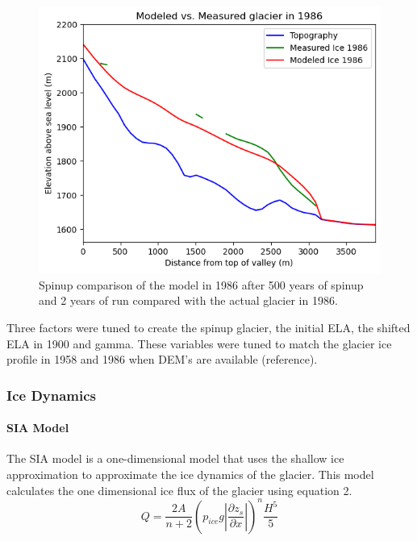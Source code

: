 \documentclass{article}
\begin{document}
\begin{figure}[h!]
    \centering
    \includegraphics[width=\textwidth]{Plots/1986_glacier_comparison.png}
    \caption{Spinup comparison of the model in 1986 after 500 years of spinup and 2 years of run compared with the actual glacier in 1986.}
    \label{fig:1986_glacier_comparison}
\end{figure}

Three factors were tuned to create the spinup glacier, the initial ELA, the shifted ELA in 1900 and gamma. These variables were tuned to 
match the glacier ice profile in 1958 and 1986 when DEM's are available (reference). 

\subsubsection{Ice Dynamics}
\paragraph{SIA Model}

The SIA model is a one-dimensional model that uses the shallow ice approximation to approximate the ice dynamics of the glacier. This model 
calculates the one dimensional ice flux of the glacier using equation 2. 
\begin{equation}Q=\frac{2A}{n+2}(p_{ice}g|\frac{\partial z_s}{\partial x}|)^n\frac{H^5}{5}\end{equation}
\end{document}
